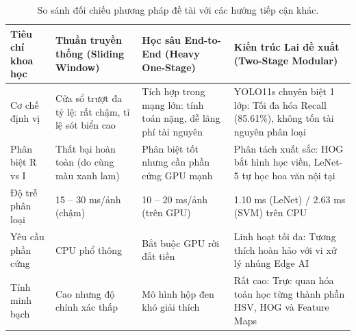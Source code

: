 \begin{table}[H]
\centering
\small
\caption{So sánh đối chiếu phương pháp đề tài với các hướng tiếp cận khác.}
\label{tab:so_sanh_ly_thuyet}
\begin{tabularx}{\textwidth}{|p{2.8cm}|p{3.5cm}|p{3.8cm}|Y|}
\hline
\textbf{Tiêu chí khoa học} & \textbf{Thuần truyền thống (Sliding Window)} & \textbf{Học sâu End-to-End (Heavy One-Stage)} & \textbf{Kiến trúc Lai đề xuất (Two-Stage Modular)} \\
\hline
Cơ chế định vị & Cửa sổ trượt đa tỷ lệ: rất chậm, tỉ lệ sót biển cao & Tích hợp trong mạng lớn: tính toán nặng, dễ lãng phí tài nguyên & YOLO11s chuyên biệt 1 lớp: Tối đa hóa Recall (85.61\%), không tốn tài nguyên phân loại \\
\hline
Phân biệt R vs I & Thất bại hoàn toàn (do cùng màu xanh lam) & Phân biệt tốt nhưng cần phần cứng GPU mạnh & Phân tách xuất sắc: HOG bắt hình học viền, LeNet-5 tự học hoa văn nội tại \\
\hline
Độ trễ phân loại & 15 -- 30 ms/ảnh (chậm) & 10 -- 20 ms/ảnh (trên GPU) & 1.10 ms (LeNet) / 2.63 ms (SVM) trên CPU \\
\hline
Yêu cầu phần cứng & CPU phổ thông & Bắt buộc GPU rời đắt tiền & Linh hoạt tối đa: Tương thích hoàn hảo với vi xử lý nhúng Edge AI \\
\hline
Tính minh bạch & Cao nhưng độ chính xác thấp & Mô hình hộp đen khó giải thích & Rất cao: Trực quan hóa toán học từng thành phần HSV, HOG và Feature Maps \\
\hline
\end{tabularx}
\end{table}
